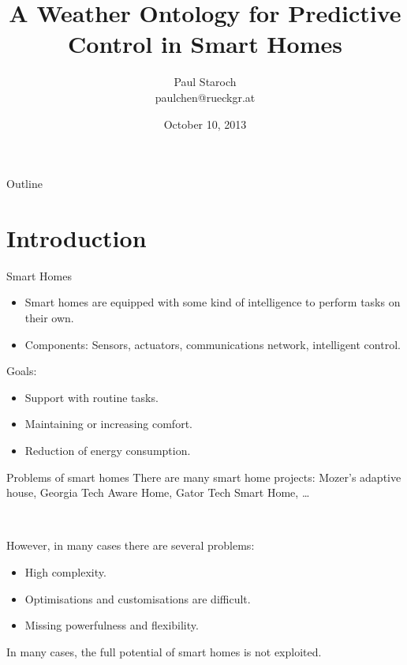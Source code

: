 \documentclass{beamer}
\title %
{A Weather Ontology for Predictive Control in Smart Homes}
\author[Paul Staroch] %
{Paul Staroch\\ {\scriptsize paulchen@rueckgr.at}} %
\institute[Vienna University of Technology] %
{
  Arbeitsgruppe Automatisierungssysteme\\
  Institut für Rechnergestützte Automation\\

  \hspace{5em}

  Supervisors:\\
  Ao.Univ.-Prof. Dipl.-Ing. Dr.techn. Wolfgang Kastner\\
  Dipl.-Ing. Mario Kofler

}
\date %
{October 10, 2013}
\begin{document}
\begin{frame}
  \titlepage
\end{frame}

\begin{frame}{Outline}
  \tableofcontents
\end{frame}




\section{Introduction}

\begin{frame}{Smart Homes}
	\begin{itemize}
		\item Smart homes are equipped with some kind of intelligence to perform tasks on their own.
		\item Components: Sensors, actuators, communications network, intelligent control.
	\end{itemize}

	Goals:
	\begin{itemize}
		\item Support with routine tasks.
		\item Maintaining or increasing comfort.
		\item Reduction of energy consumption.
	\end{itemize}
\end{frame}

\begin{frame}{Problems of smart homes}
	There are many smart home projects: Mozer's adaptive house, Georgia Tech Aware Home, Gator Tech Smart Home, …

	~

	However, in many cases there are several problems:
	\begin{itemize}
		\item High complexity.
		\item Optimisations and customisations are difficult.
		\item Missing powerfulness and flexibility.
	\end{itemize}

	In many cases, the full potential of smart homes is not exploited.
\end{frame}
\end{document}
